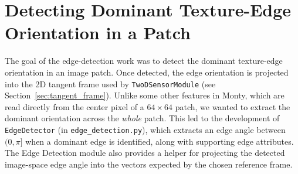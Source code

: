 \documentclass{article}
\begin{document}

\section{Detecting Dominant Texture-Edge Orientation in a Patch}
\label{edge_detection}

The goal of the edge-detection work was to detect the dominant texture-edge orientation in an image patch.
Once detected, the edge orientation is projected into the 2D tangent frame used by \texttt{TwoDSensorModule} (see Section~\ref{sec:tangent_frame}).
Unlike some other features in Monty, which are read directly from the center pixel of a $64 \times 64$ patch, we wanted to extract the dominant orientation across the \textit{whole} patch.
This led to the development of \texttt{EdgeDetector} (in \texttt{edge\_detection.py}), which extracts an edge angle between $(0, \pi]$ when a dominant edge is identified, along with supporting edge attributes.
The Edge Detection module also provides a helper for projecting the detected image-space edge angle into the vectors expected by the chosen reference frame.
\end{document}
